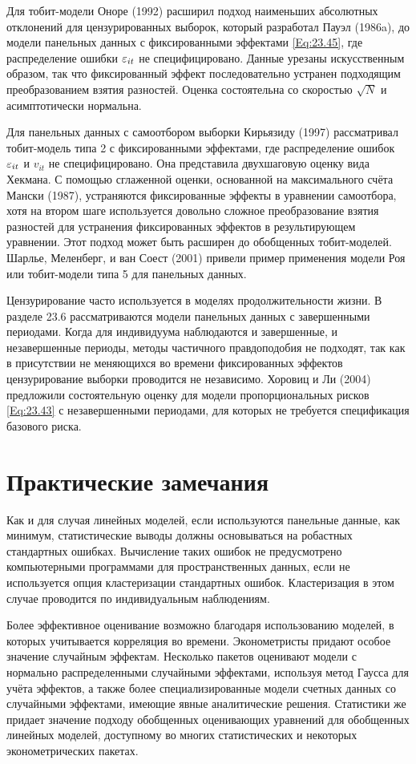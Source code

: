 Для тобит-модели Оноре (1992) расширил подход наименьших абсолютных отклонений для цензурированных выборок, который разработал Пауэл (1986a), до модели панельных данных с фиксированными эффектами \ref{Eq:23.45}, где распределение ошибки $\varepsilon_{it}$ не специфицировано. Данные урезаны искусственным образом, так что фиксированный эффект последовательно устранен подходящим преобразованием взятия разностей. Оценка состоятельна со скоростью $\sqrt{N}$ и асимптотически нормальна.

Для панельных данных с самоотбором выборки Кирьязиду (1997) рассматривал тобит-модель типа 2 с фиксированными эффектами, где распределение ошибок $\varepsilon_{it}$ и $v_{it}$  не специфицировано. Она представила двухшаговую оценку вида Хекмана. С помощью сглаженной оценки, основанной на максимального счёта Мански (1987), устраняются фиксированные эффекты в уравнении самоотбора, хотя на втором шаге используется довольно сложное преобразование взятия разностей для устранения фиксированных эффектов в результирующем уравнении. Этот подход может быть расширен до обобщенных тобит-моделей. Шарлье, Меленберг, и ван Соест (2001) привели пример применения модели Роя или тобит-модели типа 5 для панельных данных.

Цензурирование часто используется в моделях продолжительности жизни. В разделе 23.6 рассматриваются модели панельных данных с завершенными периодами. Когда для индивидуума наблюдаются и завершенные, и незавершенные периоды, методы частичного правдоподобия не подходят, так как в присутствии не меняющихся во времени фиксированных эффектов цензурирование выборки проводится не независимо. Хоровиц и Ли (2004) предложили состоятельную оценку для  модели пропорциональных рисков \ref{Eq:23.43} с незавершенными периодами, для которых не требуется спецификация базового риска.


\section{Практические замечания}
Как и для случая линейных моделей, если используются панельные данные, как минимум, статистические выводы должны основываться на робастных стандартных ошибках. Вычисление таких ошибок не предусмотрено компьютерными программами для пространственных данных, если не используется опция  кластеризации стандартных ошибок. Кластеризация в этом случае проводится по индивидуальным наблюдениям.

Более эффективное оценивание возможно благодаря использованию моделей, в которых учитывается корреляция во времени. Эконометристы придают особое значение случайным эффектам. Несколько пакетов оценивают модели с нормально распределенными случайными эффектами, используя метод Гаусса для учёта эффектов, а также более специализированные  модели счетных данных со случайными эффектами, имеющие явные аналитические решения. Статистики же придает значение подходу обобщенных оценивающих уравнений для обобщенных линейных моделей, доступному во многих статистических и некоторых эконометрических пакетах.

